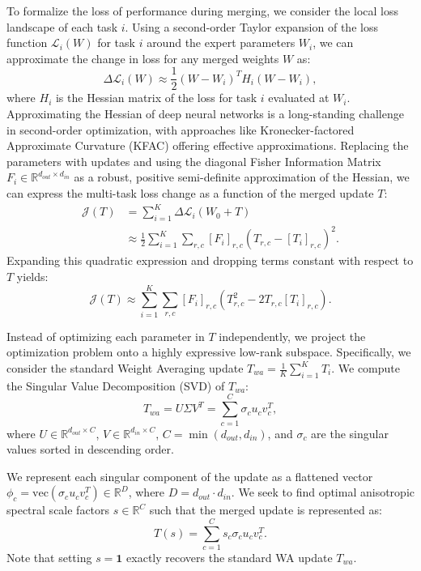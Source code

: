 \documentclass{article}
\theoremstyle{plain}
\theoremstyle{definition}
\theoremstyle{remark}
\begin{document}
To formalize the loss of performance during merging, we consider the local loss landscape of each task $i$. 
Using a second-order Taylor expansion of the loss function $\mathcal{L}_i(W)$ for task $i$ around the expert parameters $W_i$, we can approximate the change in loss for any merged weights $W$ as:
\begin{equation}
    \Delta \mathcal{L}_i(W) \approx \frac{1}{2} (W - W_i)^T H_i (W - W_i),
\end{equation}
where $H_i$ is the Hessian matrix of the loss for task $i$ evaluated at $W_i$. 
Approximating the Hessian of deep neural networks is a long-standing challenge in second-order optimization, with approaches like Kronecker-factored Approximate Curvature (KFAC) \cite{martens2015optimizing} offering effective approximations.
Replacing the parameters with updates and using the diagonal Fisher Information Matrix $F_i \in \mathbb{R}^{d_{out} \times d_{in}}$ as a robust, positive semi-definite approximation of the Hessian, we can express the multi-task loss change as a function of the merged update $T$:
\begin{align}
    \mathcal{J}(T) &= \sum_{i=1}^K \Delta \mathcal{L}_i(W_0 + T) \nonumber\\
    &\approx \frac{1}{2} \sum_{i=1}^K \sum_{r, c} [F_i]_{r,c} \left( T_{r,c} - [T_i]_{r,c} \right)^2.
\end{align}
Expanding this quadratic expression and dropping terms constant with respect to $T$ yields:
\begin{equation}
    \mathcal{J}(T) \approx \sum_{i=1}^K \sum_{r, c} [F_i]_{r,c} \left( T_{r,c}^2 - 2 T_{r,c} [T_i]_{r,c} \right).
    \label{eq:quad_surrogate}
\end{equation}

Instead of optimizing each parameter in $T$ independently, we project the optimization problem onto a highly expressive low-rank subspace. 
Specifically, we consider the standard Weight Averaging update $T_{wa} = \frac{1}{K} \sum_{i=1}^K T_i$. 
We compute the Singular Value Decomposition (SVD) of $T_{wa}$:
\begin{equation}
    T_{wa} = U \Sigma V^T = \sum_{c=1}^C \sigma_c u_c v_c^T,
\end{equation}
where $U \in \mathbb{R}^{d_{out} \times C}$, $V \in \mathbb{R}^{d_{in} \times C}$, $C = \min(d_{out}, d_{in})$, and $\sigma_c$ are the singular values sorted in descending order. 

We represent each singular component of the update as a flattened vector $\phi_c = \text{vec}(\sigma_c u_c v_c^T) \in \mathbb{R}^D$, where $D = d_{out} \cdot d_{in}$. 
We seek to find optimal anisotropic spectral scale factors $s \in \mathbb{R}^C$ such that the merged update is represented as:
\begin{equation}
    T(s) = \sum_{c=1}^C s_c \sigma_c u_c v_c^T.
\end{equation}
Note that setting $s = \mathbf{1}$ exactly recovers the standard WA update $T_{wa}$. 
\end{document}
